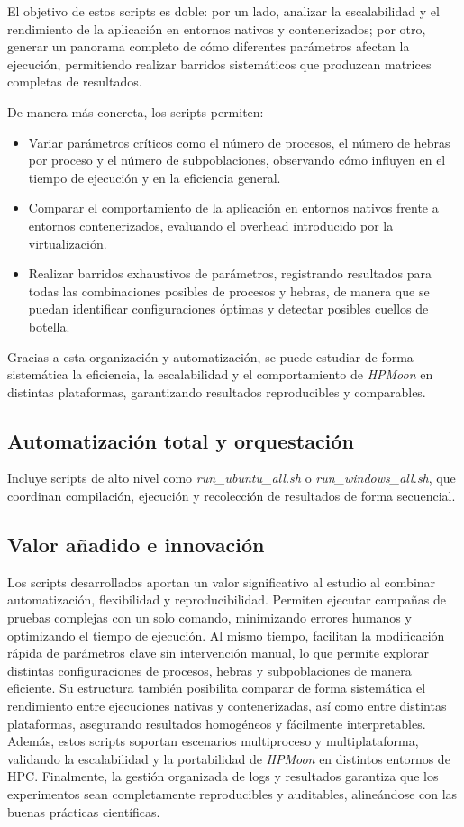 El objetivo de estos scripts es doble: por un lado, analizar la escalabilidad y el rendimiento de la aplicación en entornos nativos y contenerizados; por otro, generar un panorama completo de cómo diferentes parámetros afectan la ejecución, permitiendo realizar barridos sistemáticos que produzcan matrices completas de resultados.

De manera más concreta, los scripts permiten:

\begin{itemize}
    \item Variar parámetros críticos como el número de procesos, el número de hebras por proceso y el número de subpoblaciones, observando cómo influyen en el tiempo de ejecución y en la eficiencia general.
    \item Comparar el comportamiento de la aplicación en entornos nativos frente a entornos contenerizados, evaluando el overhead introducido por la virtualización.
    \item Realizar barridos exhaustivos de parámetros, registrando resultados para todas las combinaciones posibles de procesos y hebras, de manera que se puedan identificar configuraciones óptimas y detectar posibles cuellos de botella.
\end{itemize}

Gracias a esta organización y automatización, se puede estudiar de forma sistemática la eficiencia, la escalabilidad y el comportamiento de \textit{HPMoon} en distintas plataformas, garantizando resultados reproducibles y comparables.

\subsection{Automatización total y orquestación}
Incluye scripts de alto nivel como \textit{run\_ubuntu\_all.sh} o \textit{run\_windows\_all.sh}, que coordinan compilación, ejecución y recolección de resultados de forma secuencial.

\subsection{Valor añadido e innovación}

Los scripts desarrollados aportan un valor significativo al estudio al combinar automatización, flexibilidad y reproducibilidad. Permiten ejecutar campañas de pruebas complejas con un solo comando, minimizando errores humanos y optimizando el tiempo de ejecución. Al mismo tiempo, facilitan la modificación rápida de parámetros clave sin intervención manual, lo que permite explorar distintas configuraciones de procesos, hebras y subpoblaciones de manera eficiente. Su estructura también posibilita comparar de forma sistemática el rendimiento entre ejecuciones nativas y contenerizadas, así como entre distintas plataformas, asegurando resultados homogéneos y fácilmente interpretables. Además, estos scripts soportan escenarios multiproceso y multiplataforma, validando la escalabilidad y la portabilidad de \textit{HPMoon} en distintos entornos de HPC. Finalmente, la gestión organizada de logs y resultados garantiza que los experimentos sean completamente reproducibles y auditables, alineándose con las buenas prácticas científicas.